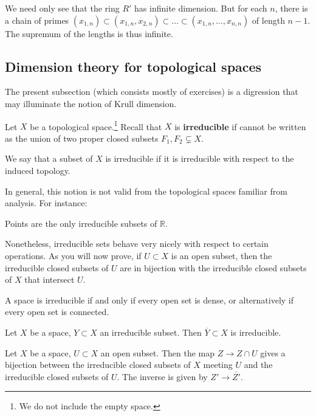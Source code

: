 We need only see that the ring $R'$ has infinite dimension. But for each $n$, there
is a chain of primes $(x_{1,n}) \subset (x_{1,n}, x_{2,n}) \subset
\dots \subset (x_{1,n}, \dots, x_{n,n})$ of length $n-1$. The supremum of the
lengths is thus infinite.
\subsection{Dimension theory for topological spaces}
\label{subsectiondimension}
The present subsection (which consists mostly of exercises) is a digression   that may illuminate the notion of
Krull dimension.

\begin{definition} 
Let $X$ be a topological space.\footnote{We do not include the empty space.} Recall that $ X$ is
\textbf{irreducible} if  cannot be written as the union of
two proper closed subsets $F_1, F_2 \subsetneq X$.

We say that a subset of $X$ is irreducible if it is irreducible with respect
to the induced topology.
\end{definition} 

In general, this notion is not valid from the topological spaces familiar from
analysis. For instance:

\begin{exercise} 
Points are the only irreducible subsets of $\mathbb{R}$.
\end{exercise} 

Nonetheless, irreducible sets behave very nicely with respect to certain
operations. As you will now prove, if $U \subset X$ is an open subset, then
the irreducible closed subsets of $U$ are in bijection with the irreducible
closed subsets of $X$ that intersect $U$. 
\begin{exercise} \label{irredifeveryopenisdense}
A space is irreducible if and only if every open set is dense, or
alternatively if every open set is connected.
\end{exercise} 

\begin{exercise} 
Let $X$ be a space, $Y \subset X$ an irreducible subset. Then 
$\overline{Y} \subset X$ is irreducible.
\end{exercise} 

\begin{exercise} 
Let $X$ be a space, $U \subset X$ an open subset. 
Then the map $Z \to Z \cap U$ gives a bijection between the irreducible
closed subsets of $X$ meeting $U$ and the irreducible closed subsets of $U$.
The inverse is given by $Z' \to \overline{Z'}$.
\end{exercise} 

